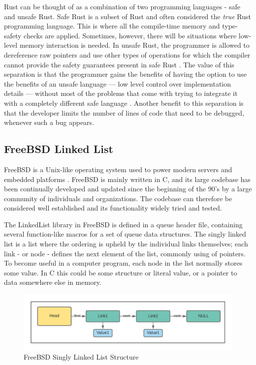 \label{safe}
Rust can be thought of as a combination of two programming languages - safe and unsafe Rust. Safe Rust is a subset of Rust and often considered the \textit{true} Rust programming language. This is where all the compile-time memory and type-safety checks are applied. Sometimes, however, there will be situations where low-level memory interaction is needed. In unsafe Rust, the programmer is allowed to dereference raw pointers and use other types of operations for which the compiler cannot provide the safety guarantees present in safe Rust \cite{THERUSTPROGRAMMINGLANGUAGE}. The value of this separation is that the programmer gains the benefits of having the option to use the benefits of an unsafe language — low level control over implementation details — without most of the problems that come with trying to integrate it with a completely different safe language \cite{RUSTONOMICON}. Another benefit to this separation is that the developer limits the number of lines of code that need to be debugged, whenever such a bug appears.


\newpage
\subsection{FreeBSD Linked List}\label{frebsd}


FreeBSD is a Unix-like operating system used to power modern servers and embedded platforms \cite{FREEBSD}. FreeBSD is mainly written in C, and its large codebase has been continually developed and updated since the beginning of the 90's by a large community of individuals and organizations. The codebase can therefore be considered well established and its functionality widely tried and tested. 

The LinkedList library in FreeBSD is defined in a queue header file, containing several function-like macros for a set of queue data structures. The singly linked list is a list where the ordering is upheld by the individual links themselves; each link - or node - defines the next element of the list, commonly using of pointers. To become useful in a computer program, each node in the list normally stores some value. In C this could be some structure or literal value, or a pointer to data somewhere else in memory.

\begin{figure}[H]
\centerline{\includegraphics[width=5in]{LinkedList.png}}
\caption{FreeBSD Singly Linked List Structure}
\label{fig:freebsdlinkedlist}
\end{figure}

